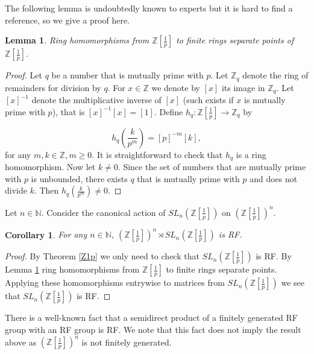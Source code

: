 \documentclass[11 pt, leqno, hidelinks]{amsart}%
\theoremstyle{plain}
\newtheorem{corollary}[theorem]{Corollary}
\newtheorem{lemma}[theorem]{Lemma}
\numberwithin{equation}{section}
\begin{document}
The following lemma is undoubtedly known to experts but it is hard to find a reference, so we give a proof here.

\begin{lemma} \label{RingHomomorphisms}  Ring homomorphisms from  $\mathbb Z[\frac{1}{p}]$ to finite rings separate points of   $\mathbb Z[\frac{1}{p}]$.
\end{lemma}
\begin{proof} Let $q$ be a number that is mutually prime with $p$. Let $\mathbb Z_q$ denote the ring of remainders for division by $q$. For $x\in \mathbb Z$ we denote  by $[x]$ its image in $\mathbb Z_q$. Let $[x]^{-1}$ denote the multiplicative inverse of $[x]$ (such exists if $x$ is mutually prime with $p$), that is $[x]^{-1} [x] = [1].$  Define $h_q: \mathbb Z[\frac{1}{p}] \to \mathbb Z_q$ by

$$h_q\left(\frac{k}{p^m}\right) = [p]^{-m} [k],$$
for any $m, k\in \mathbb Z, m\ge 0.$ It is straightforward to check that $h_q$ is a ring homomorphism. Now let $k\neq 0$. Since the set of numbers that are mutually prime with $p$ is unbounded, there exists $q$ that is mutually prime with $p$ and does not divide $k$. Then $h_q(\frac{k}{p^m}) \neq 0$.
\end{proof}


Let $n\in \mathbb N$. Consider the canonical action of  $SL_n(\mathbb Z[\frac{1}{p}])$ on $\left(\mathbb Z[\frac{1}{p}]\right)^n$.

\begin{corollary}\label{SLnZ}  For any $n\in \mathbb N$,   $\left(\mathbb Z[\frac{1}{p}]\right)^n\rtimes SL_n(\mathbb Z[\frac{1}{p}])$
is RF.
\end{corollary}
\begin{proof} By Theorem \ref{Z1p} we only need to check that  $SL_n(\mathbb Z[\frac{1}{p}])$ is RF.
By Lemma \ref{RingHomomorphisms} ring homomorphisms from  $\mathbb Z[\frac{1}{p}]$ to finite rings  separate points. Applying these homomorphisms   entrywise to matrices from $SL_n(\mathbb Z[\frac{1}{p}])$ we see that $SL_n(\mathbb Z[\frac{1}{p}])$ is RF.
\end{proof}

\medskip

There is a well-known fact that a semidirect product of a finitely generated  RF group with  an RF group is RF. We note that this fact does not imply the result above as $\left(\mathbb Z[\frac{1}{p}]\right)^n$ is not finitely generated.



\bigskip
\end{document}
